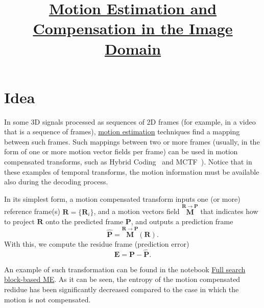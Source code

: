 
\title{\href{https://vicente-gonzalez-ruiz.github.io/motion_estimation}{Motion Estimation and Compensation in the Image Domain}}

\maketitle

\section{Idea}

In some 3D signals processed as sequences of 2D frames (for example,
in a video that is a sequence of frames),
\href{https://en.wikipedia.org/wiki/Motion_estimation}{motion
  estimation} techniques find a mapping between such frames. Such
mappings between two or more frames (usually, in the form of one or
more motion vector fields per frame) can be used in motion compensated
transforms, such as Hybrid Coding~\cite{vruiz__hybrid_coding} and
MCTF~\cite{vruiz__MCTF}). Notice that in these examples of temporal
transforms, the motion information must be available also during the
decoding process.

In its simplest form, a motion compensated transform inputs one (or
more) reference frame(s) ${\mathbf R}=\{{\mathbf R}_i\}$, and a motion
vectors field $\overset{{\mathbf R}\rightarrow{\mathbf P}}{\mathbf M}$
that indicates how to project ${\mathbf R}$ onto the predicted frame
${\mathbf P}$, and outputs a prediction frame
\begin{equation}
  \hat{{\mathbf P}} =  \overset{{\mathbf R}\rightarrow {\mathbf P}}{\mathbf M}({\mathbf R}).
  \label{eq:MCP1}
\end{equation}
With this, we compute the residue frame (prediction error)
\begin{equation}
  {\mathbf E} = {\mathbf P} - \hat{\mathbf P}.
\end{equation}

An example of such transformation can be found in the notebook
\href{https://github.com/vicente-gonzalez-ruiz/motion_estimation/blob/main/src/motion_estimation/full_search_block_ME.ipynb}{Full
  search block-based ME}. As it can be seen, the entropy of the motion
compensated redidue has been significantly decreased compared to the
case in which the motion is not compensated.

